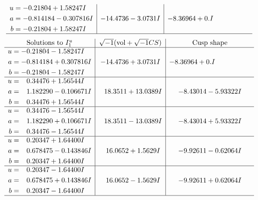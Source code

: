 \documentclass[1p]{elsarticle_modified}
\theoremstyle{definition}
\newcommand{\I}{\sqrt{-1}}
\begin{document}
$$\begin{array}{c|c|c}
\begin{aligned}
u &= -0.21804 + 1.58247 I \\
a &= -0.814184 - 0.307816 I \\
b &= -0.21804 + 1.58247 I\end{aligned}
 & -14.4736 - 3.0731 I & -8.36964 + 0. I\phantom{ +0.000000I}\\
 \hline 
 \end{array}$$\newpage$$\begin{array}{c|c|c}  
\text{Solutions to }I^u_{1}& \I (\text{vol} + \sqrt{-1}CS) & \text{Cusp shape}\\
 \hline 
\begin{aligned}
u &= -0.21804 - 1.58247 I \\
a &= -0.814184 + 0.307816 I \\
b &= -0.21804 - 1.58247 I\end{aligned}
 & -14.4736 + 3.0731 I & -8.36964 + 0. I\phantom{ +0.000000I} \\ \hline\begin{aligned}
u &= \phantom{-}0.34476 + 1.56544 I \\
a &= \phantom{-}1.182290 - 0.106671 I \\
b &= \phantom{-}0.34476 + 1.56544 I\end{aligned}
 & \phantom{-}18.3511 + 13.0389 I & -8.43014 - 5.93322 I \\ \hline\begin{aligned}
u &= \phantom{-}0.34476 - 1.56544 I \\
a &= \phantom{-}1.182290 + 0.106671 I \\
b &= \phantom{-}0.34476 - 1.56544 I\end{aligned}
 & \phantom{-}18.3511 - 13.0389 I & -8.43014 + 5.93322 I \\ \hline\begin{aligned}
u &= \phantom{-}0.20347 + 1.64400 I \\
a &= \phantom{-}0.678475 - 0.143846 I \\
b &= \phantom{-}0.20347 + 1.64400 I\end{aligned}
 & \phantom{-}16.0652 + 1.5629 I & -9.92611 - 0.62064 I \\ \hline\begin{aligned}
u &= \phantom{-}0.20347 - 1.64400 I \\
a &= \phantom{-}0.678475 + 0.143846 I \\
b &= \phantom{-}0.20347 - 1.64400 I\end{aligned}
 & \phantom{-}16.0652 - 1.5629 I & -9.92611 + 0.62064 I\\
 \hline 
 \end{array}$$\newpage\newpage\renewcommand{\arraystretch}{1}
\end{document}
